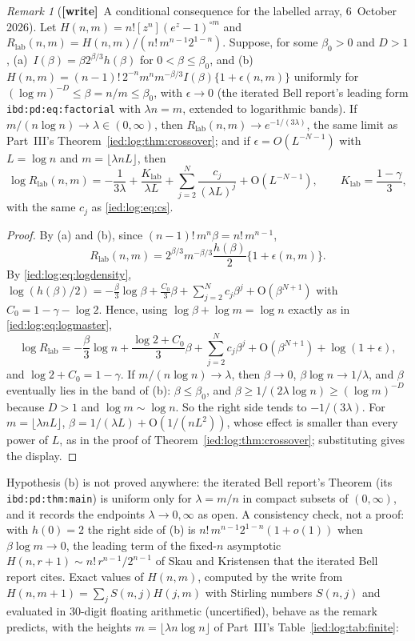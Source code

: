 \documentclass[11pt,letterpaper]{article}
\theoremstyle{remark}\newtheorem{remark}[theorem]{Remark}
\newcommand{\Oh}{\mathrm O}\newcommand{\supp}{\operatorname{supp}}
\newcommand{\wtag}{\textup{\textbf{[write]}}}
\begin{document}
\begin{remark}[\wtag\ A conditional consequence for the labelled array, 6~October 2026]\label{ied:rem:labelled}
Let $H(n,m)=n![z^n](e^z-1)^{\circ m}$ and $R_{\mathrm{lab}}(n,m)=H(n,m)/(n!\,m^{n-1}2^{1-n})$. Suppose, for some $\beta_0>0$ and $D>1$, (a)~$I(\beta)=\beta2^{\beta/3}h(\beta)$ for $0<\beta\le\beta_0$, and (b)~$H(n,m)=(n-1)!\,2^{-n}m^nm^{-\beta/3}I(\beta)\{1+\epsilon(n,m)\}$ uniformly for $(\log m)^{-D}\le\beta=n/m\le\beta_0$, with $\epsilon\to0$ (the iterated Bell report's leading form \texttt{ibd:pd:eq:factorial} with $\lambda n=m$, extended to logarithmic bands). If $m/(n\log n)\to\lambda\in(0,\infty)$, then $R_{\mathrm{lab}}(n,m)\to e^{-1/(3\lambda)}$, the same limit as Part~III's Theorem~\ref{ied:log:thm:crossover}; and if $\epsilon=O(L^{-N-1})$ with $L=\log n$ and $m=\lfloor\lambda nL\rfloor$, then
\[
 \log R_{\mathrm{lab}}(n,m)=-\frac1{3\lambda}+\frac{K_{\mathrm{lab}}}{\lambda L}+\sum_{j=2}^N\frac{c_j}{(\lambda L)^j}+\Oh(L^{-N-1}),\qquad K_{\mathrm{lab}}=\frac{1-\gamma}3,
\]
with the same $c_j$ as \eqref{ied:log:eq:cs}.
\end{remark}
\begin{proof}
By (a) and (b), since $(n-1)!\,m^n\beta=n!\,m^{n-1}$,
\[
 R_{\mathrm{lab}}(n,m)=2^{\beta/3}m^{-\beta/3}\frac{h(\beta)}2\{1+\epsilon(n,m)\}.
\]
By \eqref{ied:log:eq:logdensity}, $\log(h(\beta)/2)=-\frac\beta3\log\beta+\frac{C_0}3\beta+\sum_{j=2}^Nc_j\beta^j+\Oh(\beta^{N+1})$ with $C_0=1-\gamma-\log2$. Hence, using $\log\beta+\log m=\log n$ exactly as in \eqref{ied:log:eq:logmaster},
\[
 \log R_{\mathrm{lab}}=-\frac\beta3\log n+\frac{\log2+C_0}3\beta+\sum_{j=2}^Nc_j\beta^j+\Oh(\beta^{N+1})+\log(1+\epsilon),
\]
and $\log2+C_0=1-\gamma$. If $m/(n\log n)\to\lambda$, then $\beta\to0$, $\beta\log n\to1/\lambda$, and $\beta$ eventually lies in the band of (b): $\beta\le\beta_0$, and $\beta\ge1/(2\lambda\log n)\ge(\log m)^{-D}$ because $D>1$ and $\log m\sim\log n$. So the right side tends to $-1/(3\lambda)$. For $m=\lfloor\lambda nL\rfloor$, $\beta=1/(\lambda L)+\Oh(1/(nL^2))$, whose effect is smaller than every power of $L$, as in the proof of Theorem~\ref{ied:log:thm:crossover}; substituting gives the display.
\end{proof}
Hypothesis (b) is not proved anywhere: the iterated Bell report's Theorem (its \texttt{ibd:pd:thm:main}) is uniform only for $\lambda=m/n$ in compact subsets of $(0,\infty)$, and it records the endpoints $\lambda\to0,\infty$ as open. A consistency check, not a proof: with $h(0)=2$ the right side of (b) is $n!\,m^{n-1}2^{1-n}(1+o(1))$ when $\beta\log m\to0$, the leading term of the fixed-$n$ asymptotic $H(n,r+1)\sim n!\,r^{n-1}/2^{n-1}$ of Skau and Kristensen that the iterated Bell report cites. Exact values of $H(n,m)$, computed by the write from $H(n,m+1)=\sum_jS(n,j)H(j,m)$ with Stirling numbers $S(n,j)$ and evaluated in 30-digit floating arithmetic (uncertified), behave as the remark predicts, with the heights $m=\lfloor\lambda n\log n\rfloor$ of Part~III's Table~\ref{ied:log:tab:finite}:
\end{document}
